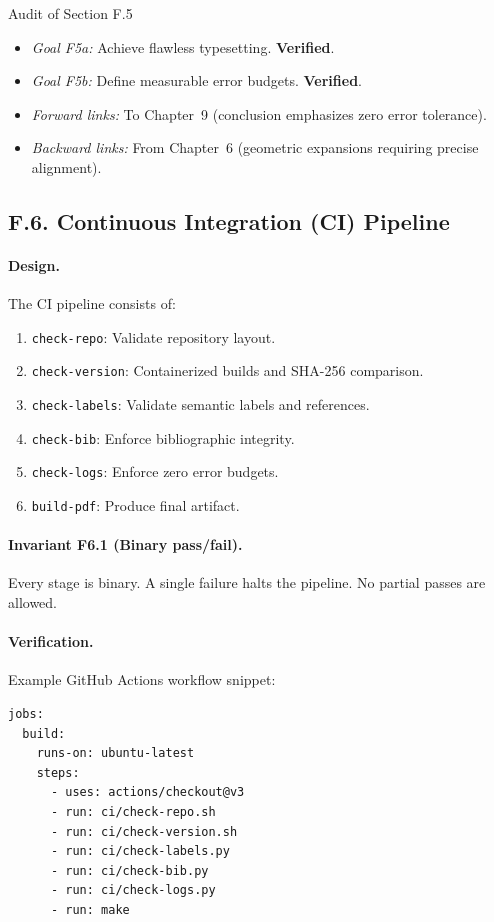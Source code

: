 \begin{auditblock}{Audit of Section F.5}
\leavevmode
\begin{itemize}
  \item \emph{Goal F5a:} Achieve flawless typesetting.
        \textbf{Verified}.
  \item \emph{Goal F5b:} Define measurable error budgets.
        \textbf{Verified}.
  \item \emph{Forward links:} To Chapter~9 (conclusion emphasizes zero
        error tolerance).
  \item \emph{Backward links:} From Chapter~6 (geometric expansions
        requiring precise alignment).
\end{itemize}
\end{auditblock}

\subsection*{F.6. Continuous Integration (CI) Pipeline}

\paragraph{Design.}
The CI pipeline consists of:
\begin{enumerate}
  \item \texttt{check-repo}: Validate repository layout.
  \item \texttt{check-version}: Containerized builds and SHA-256
        comparison.
  \item \texttt{check-labels}: Validate semantic labels and references.
  \item \texttt{check-bib}: Enforce bibliographic integrity.
  \item \texttt{check-logs}: Enforce zero error budgets.
  \item \texttt{build-pdf}: Produce final artifact.
\end{enumerate}

\paragraph{Invariant F6.1 (Binary pass/fail).}
Every stage is binary. A single failure halts the pipeline. No partial
passes are allowed.

\paragraph{Verification.}
Example GitHub Actions workflow snippet:
\begin{verbatim}
jobs:
  build:
    runs-on: ubuntu-latest
    steps:
      - uses: actions/checkout@v3
      - run: ci/check-repo.sh
      - run: ci/check-version.sh
      - run: ci/check-labels.py
      - run: ci/check-bib.py
      - run: ci/check-logs.py
      - run: make
\end{verbatim}

